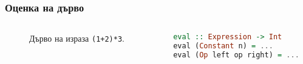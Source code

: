\documentclass{beamer}
\begin{document}
\begin{frame}[fragile]
  \frametitle{Оценка на дърво}


\begin{columns}[t]
  \begin{column}{0.3\textwidth}

    \begin{figure}
      \centering
      \caption{Дърво на израза \texttt{(1+2)*3}.}
      \label{fig:treeexpr}
      \end{figure}
      

  \end{column}
  \begin{column}{0.7\textwidth}

\begin{lstlisting}[basicstyle=\small,language=Haskell]
eval :: Expression -> Int
eval (Constant n) = ...
eval (Op left op right) = ...
\end{lstlisting}

  \end{column}
\end{columns}

\end{frame}  
\end{document}
